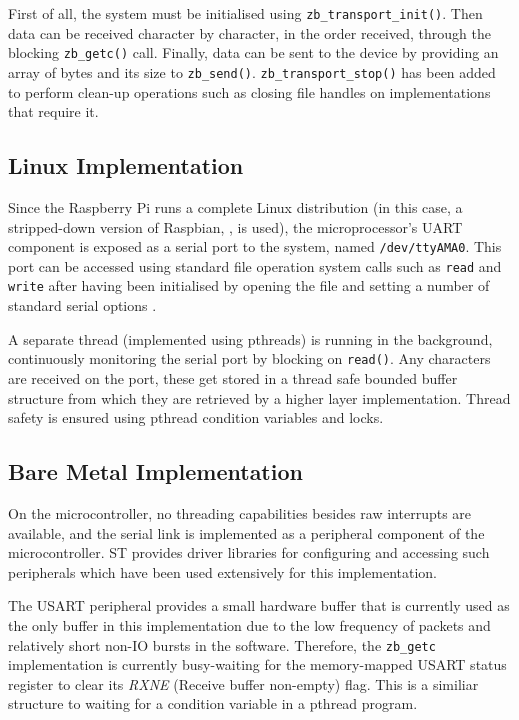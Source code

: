 First of all, the system must be initialised using \texttt{zb\_transport\_init()}. Then data can be received character by character, in the order received, through the blocking \texttt{zb\_getc()} call. Finally, data can be sent to the device by providing an array of bytes and its size to \texttt{zb\_send()}. \texttt{zb\_transport\_stop()} has been added to perform clean-up operations such as closing file handles on implementations that require it.

\subsection{Linux Implementation}
Since the Raspberry Pi runs a complete Linux distribution (in this case, a stripped-down version of Raspbian, \cite{raspbian}, is used), the microprocessor's UART component is exposed as a serial port to the system, named \texttt{/dev/ttyAMA0}. This port can be accessed using standard file operation system calls such as \texttt{read} and \texttt{write} after having been initialised by opening the file and setting a number of standard serial options \cite{posix-serial-programming}.

A separate thread (implemented using pthreads) is running in the background, continuously monitoring the serial port by blocking on \texttt{read()}. Any characters are received on the port, these get stored in a thread safe bounded buffer structure from which they are retrieved by a higher layer implementation. Thread safety is ensured using pthread condition variables and locks.

\subsection{Bare Metal Implementation}
On the microcontroller, no threading capabilities besides raw interrupts are available, and the serial link is implemented as a peripheral component of the microcontroller. ST provides driver libraries for configuring and accessing such peripherals which have been used extensively for this implementation.

The USART peripheral provides a small hardware buffer that is currently used as the only buffer in this implementation due to the low frequency of packets and relatively short non-IO bursts in the software. Therefore, the \texttt{zb\_getc} implementation is currently busy-waiting for the memory-mapped USART status register to clear its \emph{RXNE} (Receive buffer non-empty) flag. This is a similiar structure to waiting for a condition variable in a pthread program. %

